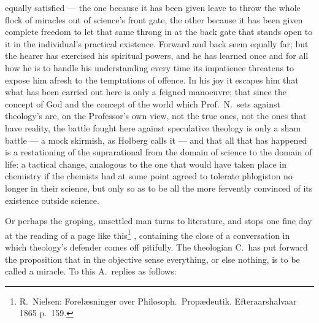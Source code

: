 \documentclass[12pt,a4paper]{book}
\renewcommand{\thefootnote}{*)}
\newcommand{\fnmark}[2]{\renewcommand{\thefootnote}{#1}\footnote{#2}%
  \renewcommand{\thefootnote}{*)}}
\newcommand{\opage}[1]{\marginnote{\footnotesize\textit{[#1]}}}
\begin{document}
equally
\opage{17}satisfied --- the one because it has been given leave to throw the
whole flock of miracles out of science's front gate, the other because it has
been given complete freedom to let that same throng in at the back gate that
stands open to it in the individual's practical existence. Forward and back
seem equally far; but the hearer has exercised his spiritual powers, and he has
learned once and for all how he is to handle his understanding every time its
impatience threatens to expose him afresh to the temptations of offence. In his
joy it escapes him that what has been carried out here is only a feigned
manoeuvre; that since the concept of God and the concept of the world which
Prof.\ N.\ sets against theology's are, on the Professor's own view, not the
true ones, not the ones that have reality, the battle fought here against
speculative theology is only a sham battle --- a mock skirmish, as Holberg
calls it --- and that all that has happened is a restationing of the
suprarational from the domain of science to the domain of life: a tactical
change, analogous to the one that would have taken place in chemistry if the
chemists had at some point agreed to tolerate phlogiston no longer in their
science, but only so as to be all the more fervently convinced of its existence
outside science.

Or perhaps the groping, unsettled man turns to literature, and stops one fine
day at the reading of a page like this\fnmark{*)}{R.\ Nielsen: Forelæsninger
over Philosoph.\ Propædeutik. Efteraarshalvaar 1865 p.\ 159.}, containing the
close
\opage{18}of a conversation in which theology's defender comes off pitifully.
The theologian C.\ has put forward the proposition that in the objective sense
everything, or else nothing, is to be called a miracle. To this A.\ replies as
follows:
\end{document}
